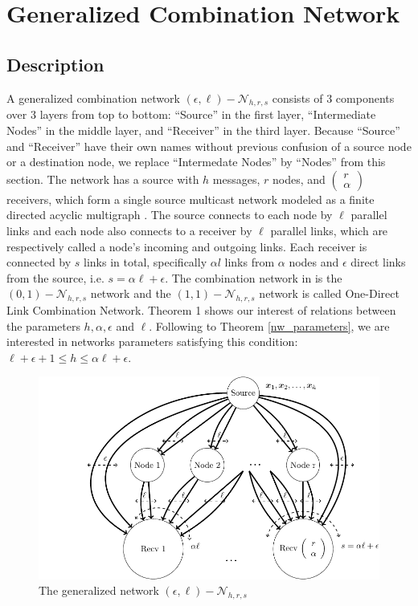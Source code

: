 \chapter{Generalized Combination Network} \label{chap:general_network}

\section{Description \label{sec:Description_GCN}}

A generalized combination network $(\epsilon,\ell)-\mathcal{N}_{h,r,s}$
consists of 3 components over 3 layers from top to bottom: ``Source''
in the first layer, ``Intermediate Nodes'' in the middle layer,
and ``Receiver'' in the third layer. Because ``Source'' and ``Receiver''
have their own names without previous confusion of a source node or
a destination node, we replace ``Intermedate Nodes'' by ``Nodes''
from this section. The network has a source with $h$ messages, $r$
nodes, and $\left(\begin{array}{c}
r\\
\alpha
\end{array}\right)$ receivers, which form a single source multicast network modeled as
a finite directed acyclic multigraph \cite{Li:2003,Riis:2006,Wachter-Zeh:2018}.
The source connects to each node by $\ell$ parallel links and each
node also connects to a receiver by $\ell$ parallel links, which
are respectively called a node's incoming and outgoing links. Each
receiver is connected by $s$ links in total, specifically $\alpha l$
links from $\alpha$ nodes and $\epsilon$ direct links from the source,
i.e. $s=\alpha\ell+\epsilon$. The combination network in \cite{Riis:2006}
is the $(0,1)-\mathcal{N}_{h,r,s}$ network and the $(1,1)-\mathcal{N}_{h,r,s}$
network is called One-Direct Link Combination Network. Theorem 1 shows
our interest of relations between the parameters $h,\alpha,\epsilon$
and $\ell$. Following to Theorem \ref{nw_parameters}, we are interested
in networks parameters satisfying this condition: $\ell+\epsilon+1\leq h\leq\alpha\ell+\epsilon$.
\begin{figure}[H]
\caption{The generalized network $(\epsilon,\ell)-\mathcal{N}_{h,r,s}$\label{fig:The-generalized-network}}

\centering{}\includegraphics[width=0.5\paperwidth]{./figures/generalized_combination_nw}
\end{figure}

